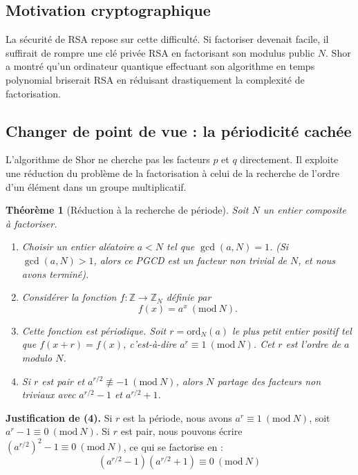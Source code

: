 \documentclass[11pt,a4paper]{article}
\newtheorem{theorem}{Théorème}[section]
\newcommand{\Mod}[1]{\ (\mathrm{mod}\ #1)}
\begin{document}
\subsection{Motivation cryptographique}

La sécurité de RSA repose sur cette difficulté. Si factoriser devenait facile, il suffirait de rompre une clé privée RSA en factorisant son modulus public $N$. Shor a montré qu'un ordinateur quantique effectuant son algorithme en temps polynomial briserait RSA en réduisant drastiquement la complexité de factorisation.

\subsection{Changer de point de vue : la périodicité cachée}

L'algorithme de Shor ne cherche pas les facteurs $p$ et $q$ directement. Il exploite une réduction du problème de la factorisation à celui de la recherche de l'ordre d'un élément dans un groupe multiplicatif.

\begin{theorem}[Réduction à la recherche de période]
Soit $N$ un entier composite à factoriser.
\begin{enumerate}
\item Choisir un entier aléatoire $a < N$ tel que $\gcd(a, N) = 1$. (Si $\gcd(a, N) > 1$, alors ce PGCD est un facteur non trivial de $N$, et nous avons terminé).

\item Considérer la fonction $f : \mathbb{Z} \to \mathbb{Z}_N$ définie par 
\[f(x) = a^x \Mod{N}.\]

\item Cette fonction est périodique. Soit $r = \text{ord}_N(a)$ le plus petit entier positif tel que $f(x + r) = f(x)$, c'est-à-dire $a^r \equiv 1 \Mod{N}$. Cet $r$ est l'ordre de $a$ modulo $N$.

\item Si $r$ est pair et $a^{r/2} \not\equiv -1 \Mod{N}$, alors $N$ partage des facteurs non triviaux avec $a^{r/2} - 1$ et $a^{r/2} + 1$.
\end{enumerate}
\end{theorem}

\textbf{Justification de (4).} Si $r$ est la période, nous avons $a^r \equiv 1 \Mod{N}$, soit $a^r - 1 \equiv 0 \Mod{N}$. Si $r$ est pair, nous pouvons écrire $(a^{r/2})^2 - 1 \equiv 0 \Mod{N}$, ce qui se factorise en :
\[(a^{r/2} - 1)(a^{r/2} + 1) \equiv 0 \Mod{N}\]
\end{document}
